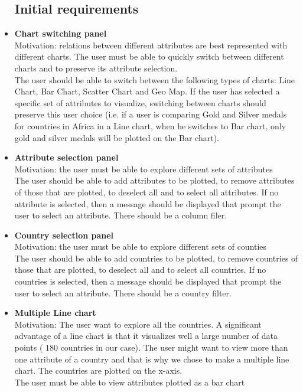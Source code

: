 \documentclass[a4paper]{article}
\begin{document}
\begin{itemize}
\subsection{Initial requirements}
\item{\textbf{Chart switching panel}\\Motivation: relations between different attributes are best represented with different charts. The user must be able to quickly switch between different charts and to preserve its attribute selection.\\The user should be able to switch between the following types of charts: Line Chart, Bar Chart, Scatter Chart and Geo Map. If the user has selected a specific set of attributes to visualize, switching between charts should preserve this user choice (i.e. if a user is comparing Gold and Silver medals for countries in Africa in a Line chart, when he switches to Bar chart, only gold and silver medals will be plotted on the Bar chart).}
\item{\textbf{Attribute selection panel}\\Motivation: the user must be able to explore different sets of attributes\\The user should be able to add attributes to be plotted, to remove attributes of those that are plotted, to deselect all and to select all attributes. If no attribute is selected, then a message should be displayed that prompt the user to select an attribute. There should be a column filer.}
\item{\textbf{Country selection panel}\\Motivation: the user must be able to explore different sets of counties\\The user should be able to add countries to be plotted, to remove countries of those that are plotted, to deselect all and to select all countries. If no countries is selected, then a message should be displayed that prompt the user to select an attribute. There should be a country filter.}
\item{\textbf{Multiple Line chart}\\Motivation: The user want to explore all the countries. A significant advantage of a line chart is that it visualizes well a large number of data points ( 180 countries in our case). The user might want to view more than one attribute of a country and that is why we chose to make a multiple line chart. The countries are plotted on the x-axis.\\The user must be able to view attributes plotted as a bar chart}

\end{itemize}
\end{document}
